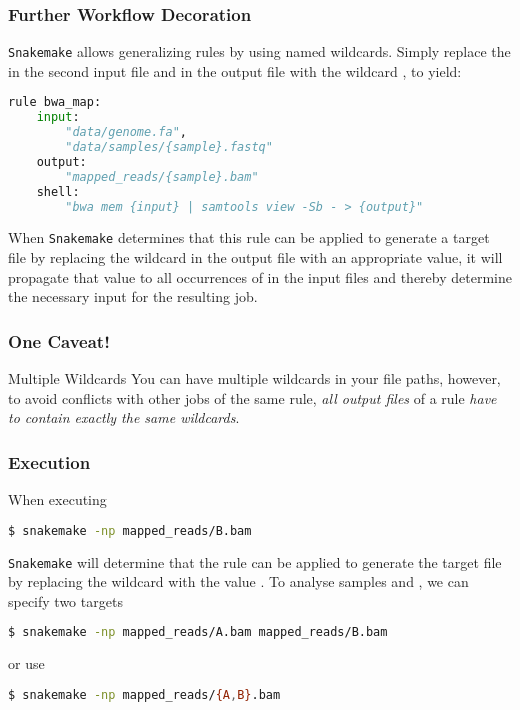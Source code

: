 \begin{frame}[fragile]
  \frametitle{Further Workflow Decoration}\footnotesize 
  \texttt{Snakemake} allows generalizing rules by using named wildcards. Simply replace the  in the second input file and in the output file with the wildcard , to yield:
  \begin{lstlisting}[language=Python,style=Python,basicstyle=\footnotesize]
rule bwa_map:
    input:
        "data/genome.fa",
        "data/samples/{sample}.fastq"
    output:
        "mapped_reads/{sample}.bam"
    shell:
        "bwa mem {input} | samtools view -Sb - > {output}"
  \end{lstlisting}
  When \texttt{Snakemake} determines that this rule can be applied to generate a target file by replacing the wildcard  in the output file with an appropriate value, it will propagate that value to all occurrences of  in the input files and thereby determine the necessary input for the resulting job. 
\end{frame}

\begin{frame}
  \frametitle{One Caveat!}
  \begin{alertblock}{Multiple Wildcards}
    You can have multiple wildcards in your file paths, however, to avoid conflicts with other jobs of the same rule, \emph{all output files} of a rule \emph{have to contain exactly the same wildcards}.
  \end{alertblock}
\end{frame}

\begin{frame}[fragile]
  \frametitle{Execution}
  When executing
  \begin{lstlisting}[language=Bash, style=Shell]
$ snakemake -np mapped_reads/B.bam
  \end{lstlisting}
  \texttt{Snakemake} will determine that the rule  can be applied to generate the target file by replacing the wildcard  with the value .\newline
  To analyse samples  and , we can specify two targets
    \begin{lstlisting}[language=Bash, style=Shell]
$ snakemake -np mapped_reads/A.bam mapped_reads/B.bam
  \end{lstlisting}
  or use 
  \begin{lstlisting}[language=Bash, style=Shell]
$ snakemake -np mapped_reads/{A,B}.bam
  \end{lstlisting}
\end{frame}





